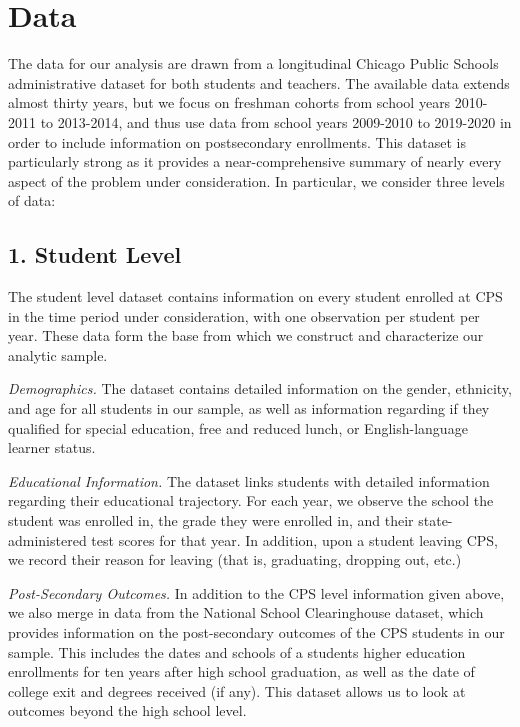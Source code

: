 \documentclass{article}\usepackage{knitr}
\begin{document}


\doublespacing

\section{Data}
\label{section:data}

The data for our analysis are drawn from a longitudinal Chicago Public Schools administrative dataset for both students and teachers. The available data extends almost thirty years, but we focus on freshman cohorts from school years 2010-2011 to 2013-2014, and thus use data from school years 2009-2010 to 2019-2020 in order to include information on postsecondary enrollments. This dataset is particularly strong as it provides a near-comprehensive summary of nearly every aspect of the problem under consideration. In particular, we consider three levels of data:

\subsection{1. Student Level} 

The student level dataset contains information on every student enrolled at CPS in the time period under consideration, with one observation per student per year. These data form the base from which we construct and characterize our analytic sample. 

\textit{Demographics.} The dataset contains detailed information on the gender, ethnicity, and age for all students in our sample, as well as information regarding if they qualified for special education, free and reduced lunch, or English-language learner status. 

\textit{Educational Information.} The dataset links students with detailed information regarding their educational trajectory. For each year, we observe the school the student was enrolled in, the grade they were enrolled in, and their state-administered test scores for that year. In addition, upon a student leaving CPS, we record their reason for leaving (that is, graduating, dropping out, etc.)

\textit{Post-Secondary Outcomes.} In addition to the CPS level information given above, we also merge in data from the National School Clearinghouse dataset, which provides information on the post-secondary outcomes of the CPS students in our sample. This includes the dates and schools of a students higher education enrollments for ten years after high school graduation, as well as the date of college exit and degrees received (if any). This dataset allows us to look at outcomes beyond the high school level. 
\end{document}
